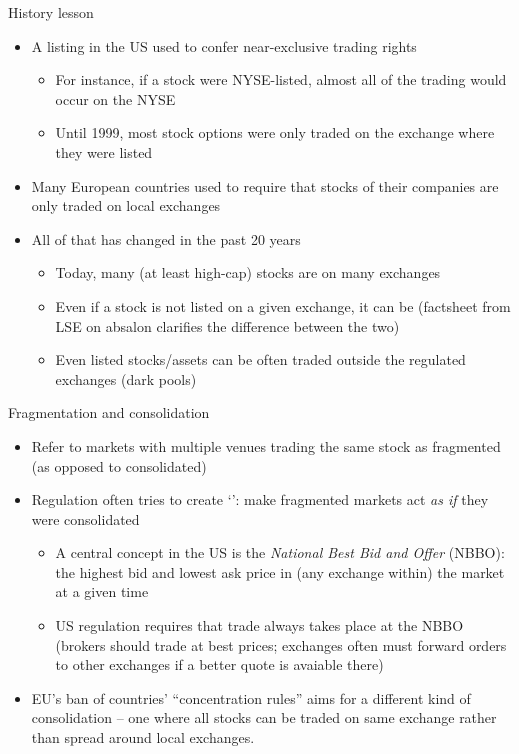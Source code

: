 \documentclass[english,10pt
,aspectratio=169
]{beamer}
\begin{document}
\begin{frame}{History lesson}
	\begin{itemize}
		\item A listing in the US used to confer near-exclusive trading rights
		\begin{itemize}
			\item For instance, if a stock were NYSE-listed, almost all of the trading would occur on the NYSE
			\item Until 1999, most stock options were only traded on the exchange where they were listed
		\end{itemize}
		\item Many European countries used to require that stocks of their companies are only traded on local exchanges
		\pause
		\item All of that has changed in the past 20 years
		\begin{itemize}
			\item Today, many (at least high-cap) stocks are  on many exchanges
			\item Even if a stock is not listed on a given exchange, it can be  
			(factsheet from LSE on absalon clarifies the difference between the two)
			\item Even listed stocks/assets can be often traded outside the regulated exchanges (dark pools)
		\end{itemize}
	\end{itemize}
\end{frame}


\begin{frame}{Fragmentation and consolidation}
	\begin{itemize}
		\item Refer to markets with multiple venues trading the same stock as \alert{fragmented} (as opposed to consolidated)
		\item Regulation often tries to create `': make fragmented markets act \textit{as if} they were consolidated
		\begin{itemize}
			\item A central concept in the US is the \textit{National Best Bid and Offer} (NBBO): the highest bid and lowest ask price in (any exchange within) the market at a given time
			\item US regulation requires that trade always takes place at the NBBO (brokers should trade at best prices; exchanges often must forward orders to other exchanges if a better quote is avaiable there)
		\end{itemize}
		\pause
		\item EU's \alert{ban} of countries' ``\alert{concentration rules}'' aims for a different kind of consolidation -- one where all stocks can be traded on same exchange rather than spread around local exchanges.
	\end{itemize}
\end{frame}
\end{document}
